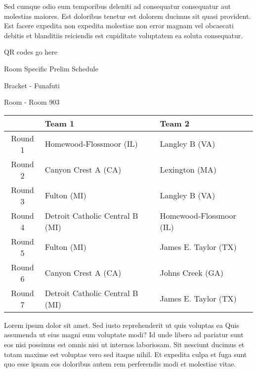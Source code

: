 \documentclass{article}%
\begin{document}
\newline%
Sed cumque odio eum temporibus deleniti ad consequatur consequatur aut molestias maiores. Est doloribus tenetur est dolorem ducimus sit quasi provident. Est facere expedita non expedita molestiae non error magnam vel obcaecati debitis et blanditiis reiciendis est cupiditate voluptatem ea soluta consequatur.%
\vspace*{140pt}%
\begin{center}%
\begin{Huge}%
QR codes go here%
\end{Huge}%
\end{center}%
\newpage%
\begin{center}%
\begin{Huge}%
Room Specific Prelim Schedule%
\end{Huge}%
\vspace*{8pt}%
\linebreak%
\begin{Large}%
Bracket {-} Funafuti%
\end{Large}%
\vspace*{8pt}%
\linebreak%
\vspace*{8pt}%
\begin{Large}%
Room {-} Room 903%
\end{Large}%
\end{center}%
%
\begin{tabularx}{\textwidth}{|c|Y|Y|}%
\hline%
&Team 1&Team 2\\%
\hline%
Round 1&Homewood{-}Flossmoor (IL)&Langley B (VA)\\%
Round 2&Canyon Crest A (CA)&Lexington (MA)\\%
Round 3&Fulton (MI)&Langley B (VA)\\%
Round 4&Detroit Catholic Central B (MI)&Homewood{-}Flossmoor (IL)\\%
Round 5&Fulton (MI)&James E. Taylor (TX)\\%
Round 6&Canyon Crest A (CA)&Johns Creek (GA)\\%
Round 7&Detroit Catholic Central B (MI)&James E. Taylor (TX)\\%
\hline%
\end{tabularx}%
\vspace*{8pt}%
\newline%
Lorem ipsum dolor sit amet. Sed iusto reprehenderit ut quis voluptas ea Quis assumenda ut eius magni eum voluptate modi? Id unde libero ad pariatur sunt eos nisi possimus est omnis nisi ut internos laboriosam. Sit nesciunt ducimus et totam maxime est voluptas vero sed itaque nihil. Et expedita culpa et fuga sunt quo esse ipsam eos doloribus autem rem perferendis modi et molestiae vitae.\newline%
\end{document}
